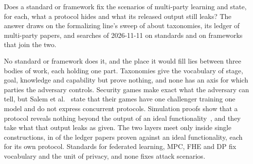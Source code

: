\documentclass{labreport}
\begin{document}
\lrmaketitle

\lrscope
Does a standard or framework fix the scenarios of multi-party learning and state, for each, what a protocol hides and what its released output still leaks?
The answer draws on the formalizing line's sweep of about  taxonomies, its ledger of  multi-party papers, and  searches of 2026-11-11 on standards and on frameworks that join the two.

\lrresult
No standard or framework does it, and the place it would fill lies between three bodies of work, each holding one part.
Taxonomies give the vocabulary of stage, goal, knowledge and capability but prove nothing, and none has an axis for which parties the adversary controls.
Security games make exact what the adversary can tell, but Salem et al.~\cite{SCEKPSTZ23} state that their  games have one challenger training one model and do not express concurrent protocols.
Simulation proofs show that a protocol reveals nothing beyond the output of an ideal functionality~\cite{MOJC23,MWAPR23}, and they take what that output leaks as given.
The two layers meet only inside single constructions, in  of the  ledger papers proven against an ideal functionality, each for its own protocol.
Standards for federated learning, MPC, FHE and DP fix vocabulary and the unit of privacy, and none fixes attack scenarios.


\lrproduced
\begin{lrfacts}
\end{lrfacts}
\end{document}
